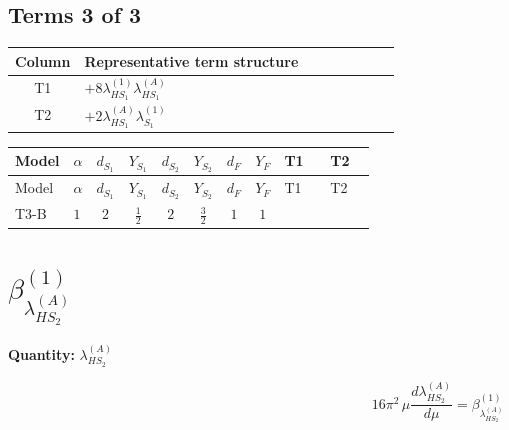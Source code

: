 \documentclass[8pt]{article}
\begin{document}
\begin{landscape}
\subsection*{Terms 3 of 3}
\begin{center}
\begin{tabular}{@{}c >{\raggedright\arraybackslash}p{0.82\linewidth}@{}}
\toprule
Column & Representative term structure \\
\midrule
T1 & \(\displaystyle +8 {\lambda_{HS_1}^{(1)}} {\lambda_{HS_1}^{(A)}}\) \\
\midrule
T2 & \(\displaystyle +2 {\lambda_{HS_1}^{(A)}} {\lambda_{S_1}^{(1)}}\) \\
\midrule
\bottomrule
\end{tabular}
\end{center}
\smallskip
\tiny
\begin{longtable}{@{}llcccccc >{\raggedright\arraybackslash}p{0.21\linewidth} >{\raggedright\arraybackslash}p{0.21\linewidth}@{}}
\toprule
Model & $\alpha$ & $d_{S_1}$ & $Y_{S_1}$ & $d_{S_2}$ & $Y_{S_2}$ & $d_F$ & $Y_F$ & T1 & T2 \\
\midrule
\endfirsthead
\toprule
Model & $\alpha$ & $d_{S_1}$ & $Y_{S_1}$ & $d_{S_2}$ & $Y_{S_2}$ & $d_F$ & $Y_F$ & T1 & T2 \\
\midrule
\endhead
T3-B & $1$ & $2$ & $\frac{1}{2}$ & $2$ & $\frac{3}{2}$ & $1$ & $1$ & \scriptsize\adjustbox{max width=\linewidth}{$\begin{gathered} +8 {\lambda_{HS_1}^{(1)}} {\lambda_{HS_1}^{(A)}}\end{gathered}$} & \scriptsize\adjustbox{max width=\linewidth}{$\begin{gathered} +2 {\lambda_{HS_1}^{(A)}} {\lambda_{S_1}^{(1)}}\end{gathered}$} \\
\midrule
\bottomrule
\end{longtable}
\clearpage
\section*{$\beta_{\lambda_{HS_2}^{(A)}}^{(1)}$}
\noindent\textbf{Quantity: }$\lambda_{HS_2}^{(A)}$\par\smallskip
\[16\pi^2\,\mu\frac{d \lambda_{HS_2}^{(A)}}{d\mu}=\beta_{\lambda_{HS_2}^{(A)}}^{(1)}\]

\end{landscape}
\end{document}
